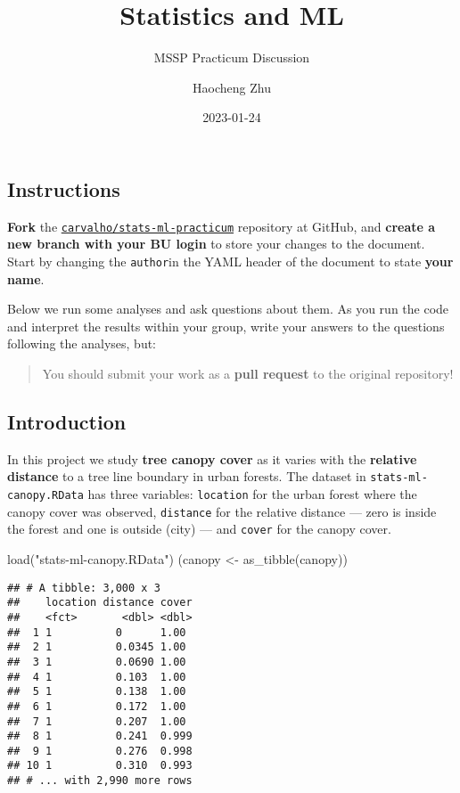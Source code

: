 \documentclass[
]{article}
\title{Statistics and ML}
\subtitle{MSSP Practicum Discussion}
\author{Haocheng Zhu}
\date{2023-01-24}
\newenvironment{Shaded}{\begin{snugshade}}{\end{snugshade}}
\newcommand{\FunctionTok}[1]{\textcolor[rgb]{0.00,0.00,0.00}{#1}}
\newcommand{\NormalTok}[1]{#1}
\newcommand{\OtherTok}[1]{\textcolor[rgb]{0.56,0.35,0.01}{#1}}
\newcommand{\StringTok}[1]{\textcolor[rgb]{0.31,0.60,0.02}{#1}}
\begin{document}
\maketitle

\hypertarget{instructions}{%
\subsection{Instructions}\label{instructions}}

\textbf{Fork} the
\href{https://github.com/carvalho/stats-ml-practicum}{\texttt{carvalho/stats-ml-practicum}}
repository at GitHub, and \textbf{create a new branch with your BU
login} to store your changes to the document. Start by changing the
\texttt{author}in the YAML header of the document to state \textbf{your
name}.

Below we run some analyses and ask questions about them. As you run the
code and interpret the results within your group, write your answers to
the questions following the analyses, but:

\begin{quote}
You should submit your work as a \textbf{pull request} to the original
repository!
\end{quote}

\hypertarget{introduction}{%
\subsection{Introduction}\label{introduction}}

In this project we study \textbf{tree canopy cover} as it varies with
the \textbf{relative distance} to a tree line boundary in urban forests.
The dataset in \texttt{stats-ml-canopy.RData} has three variables:
\texttt{location} for the urban forest where the canopy cover was
observed, \texttt{distance} for the relative distance --- zero is inside
the forest and one is outside (city) --- and \texttt{cover} for the
canopy cover.

\begin{Shaded}
\begin{Highlighting}[]
\FunctionTok{load}\NormalTok{(}\StringTok{"stats{-}ml{-}canopy.RData"}\NormalTok{)}
\NormalTok{(canopy }\OtherTok{\textless{}{-}} \FunctionTok{as\_tibble}\NormalTok{(canopy))}
\end{Highlighting}
\end{Shaded}

\begin{verbatim}
## # A tibble: 3,000 x 3
##    location distance cover
##    <fct>       <dbl> <dbl>
##  1 1          0      1.00 
##  2 1          0.0345 1.00 
##  3 1          0.0690 1.00 
##  4 1          0.103  1.00 
##  5 1          0.138  1.00 
##  6 1          0.172  1.00 
##  7 1          0.207  1.00 
##  8 1          0.241  0.999
##  9 1          0.276  0.998
## 10 1          0.310  0.993
## # ... with 2,990 more rows
\end{verbatim}
\end{document}
